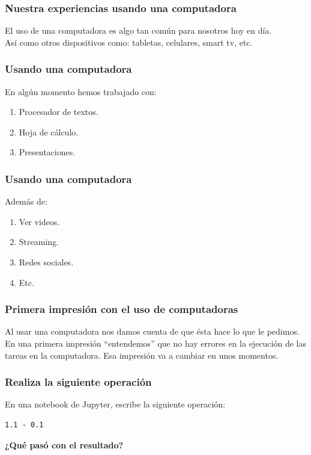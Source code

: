 \documentclass[12pt]{beamer}
\begin{document}
\begin{frame}
\frametitle{Nuestra experiencias usando una computadora}
El uso de una computadora es algo tan común para nosotros hoy en día.
\\
\bigskip
\pause
Así como otros dispositivos como: tabletas, celulares, smart tv, etc.
\end{frame}
\begin{frame}
\frametitle{Usando una computadora}
En algún momento hemos trabajado con:
\begin{enumerate}[<+->]
\item Procesador de textos.
\item Hoja de cálculo.
\item Presentaciones.
\end{enumerate}
\end{frame}
\begin{frame}
\frametitle{Usando una computadora}
Además de:
\begin{enumerate}[<+->]
\item Ver videos.
\item Streaming.
\item Redes sociales.
\item Etc.
\end{enumerate}
\end{frame}
\begin{frame}
\frametitle{Primera impresión con el uso de computadoras}
Al usar una computadora nos damos cuenta de que ésta hace lo que le pedimos.
\\
\bigskip
\pause
En una primera impresión \enquote{entendemos} que no hay errores en la ejecución de las tareas en la computadora. \pause Esa impresión va a cambiar en unos momentos.
\end{frame}
\begin{frame}[fragile]
\frametitle{Realiza la siguiente operación}
En una notebook de Jupyter, escribe la siguiente operación:
\begin{lstlisting}[caption=Diferencia entre dos valores]
1.1 - 0.1
\end{lstlisting}
\pause
\textbf{¿Qué pasó con el resultado?}
\end{frame}
\end{document}
